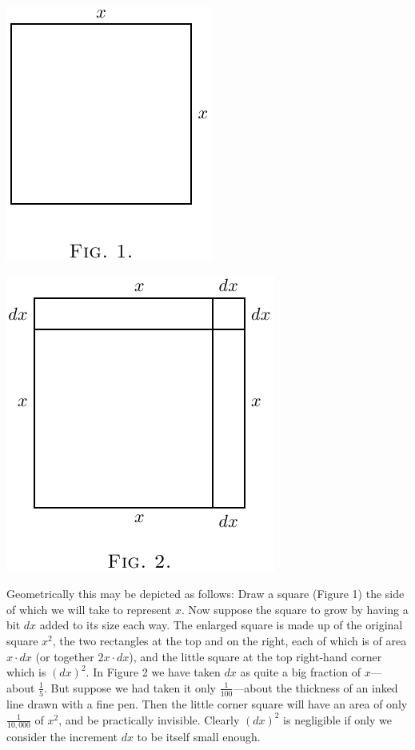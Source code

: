 \documentclass{ximera}
\begin{document}
\begin{image}
  \includegraphics{018a.png}
\end{image}

\begin{image}
  \includegraphics{019a.png}
\end{image}

Geometrically this may be depicted as follows: Draw a square (Figure
1) the side of which we will take to represent $x$. Now suppose the
square to grow by having a bit $dx$ added to its size each way. The
enlarged square is made up of the original square $x^2$, the two
rectangles at the top and on the right, each of which is of area $x
\cdot dx$ (or together $2x \cdot dx$), and the little square at the
top right-hand corner which is $(dx)^2$. In Figure 2 we have taken
$dx$ as quite a big fraction of $x$---about $\frac{1}{5}$. But suppose
we had taken it only $\frac{1}{100}$---about the thickness of an inked
line drawn with a fine pen. Then the little corner square will have an
area of only $\frac{1}{10,000}$ of $x^2$, and be practically
invisible. Clearly $(dx)^2$ is negligible if only we consider the
increment $dx$ to be itself small enough.
\end{document}
